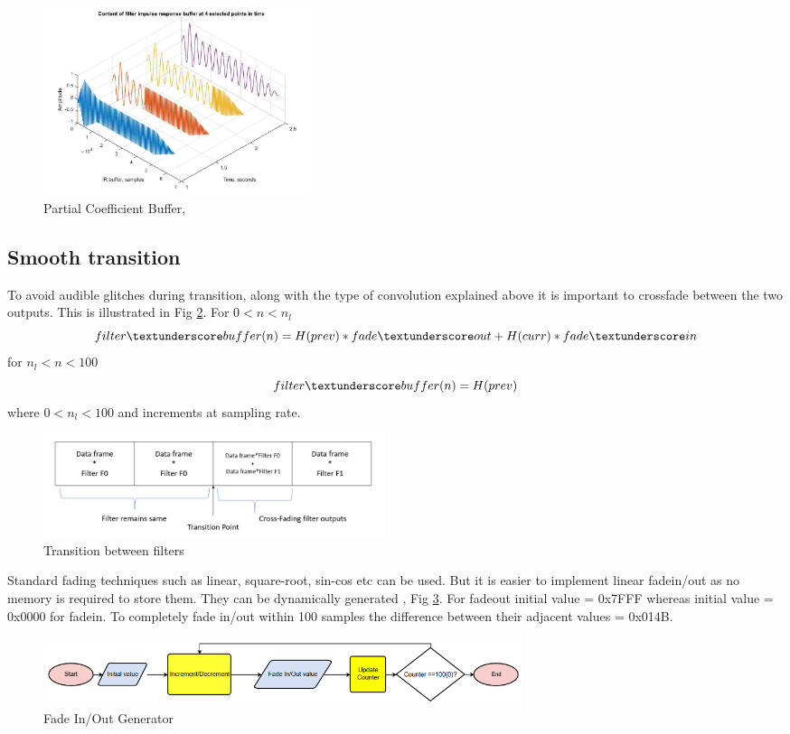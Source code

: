 \documentclass[conference]{IEEEtran}
\begin{document}
\begin{figure}
    \centering
    \includegraphics[width = 8cm]{coeffupdate.png}
    \caption{Partial Coefficient Buffer, \cite{live}}
    \label{fig:coeffupdate}
\end{figure}

\subsection{Smooth transition}
 To avoid audible glitches during transition, along with the type of convolution explained above it is important to crossfade between the two outputs. This is illustrated in Fig \ref{fig:crossfade}. 
 For $0<n<n_l$
 \begin{equation}
     filter \textunderscore buffer(n) = H(prev)*fade \textunderscore out + H(curr)*fade \textunderscore in
 \end{equation}
 for $n_l<n<100$ 
 \begin{equation}
     filter \textunderscore buffer(n) =  H(prev)
 \end{equation}
 where $0<n_l<100$ and increments at sampling rate. 
 \begin{figure}
     \centering
     \includegraphics[width = 10cm]{Crossfade.png}
     \caption{Transition between filters}
     \label{fig:crossfade}
 \end{figure}
 
 Standard fading techniques such as linear, square-root, sin-cos etc can be used. But it is easier to implement linear fadein/out as no memory is required to store them. They can be dynamically generated , Fig \ref{fig:fadegen}. For fade\textunderscore out initial value = 0x7FFF whereas initial value = 0x0000 for fade\textunderscore in. To completely fade in/out within 100 samples the difference between their adjacent values = 0x014B. 
 \begin{figure}
     \centering
     \includegraphics[width = \linewidth, height = 2cm]{fade_gen.png}
     \caption{Fade In/Out Generator}
     \label{fig:fadegen}
 \end{figure}
 
\end{document}
